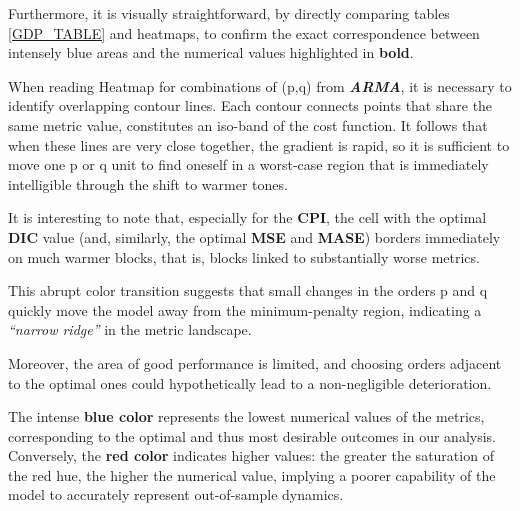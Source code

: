 \documentclass{Configuration_Files/PoliMi3i_thesis}
\begin{document}
Furthermore, it is visually straightforward, by directly comparing tables \ref{GDP_TABLE} and heatmaps, to confirm the exact correspondence between intensely blue areas and the numerical values highlighted in \textbf{bold}.

When reading Heatmap for combinations of (p,q) from \textbf{\textit{ARMA}}, it is necessary to identify overlapping contour lines. Each contour connects points that share the same metric value, constitutes an iso-band of the cost function. It follows that when these lines are very close together, the gradient is rapid, so it is sufficient to move one p or q unit to find oneself in a worst-case region that is immediately intelligible through the shift to warmer tones.

It is interesting to note that, especially for the \textbf{CPI}, the cell with the optimal \textbf{DIC} value (and, similarly, the optimal \textbf{MSE} and \textbf{MASE}) borders immediately on much warmer blocks, that is, blocks linked to substantially worse metrics. 

This abrupt color transition suggests that small changes in the orders p and q quickly move the model away from the minimum-penalty region, indicating a \textit{“narrow ridge”} in the metric landscape. 


Moreover, the area of good performance is limited, and choosing orders adjacent to the optimal ones could hypothetically lead to a non-negligible deterioration.


The intense \textbf{blue color} represents the lowest numerical values of the metrics, corresponding to the optimal and thus most desirable outcomes in our analysis. Conversely, the \textbf{red color} indicates higher values: the greater the saturation of the red hue, the higher the numerical value, implying a poorer capability of the model to accurately represent out-of-sample dynamics.
\end{document}
